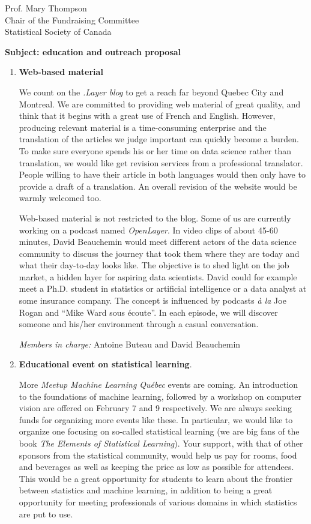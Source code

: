 \documentclass[11pt, a4paper]{letter} %
\begin{document}
\begin{letter}{
	Prof. Mary Thompson\\
	Chair of the Fundraising Committee\\
	Statistical Society of Canada
	
	\bigskip
	\textbf{Subject: education and outreach proposal}%
}
\begin{enumerate}
	\bigskip
	\emph{Member in charge:} Stéphane Caron\\
	
	\item \textbf{Web-based material}
	
	\quad We count on the \emph{.Layer blog} to get a reach far beyond Quebec City and Montreal. We are committed to providing web material of great quality, and think that it begins with a great use of French and English. However, producing relevant material is a time-consuming enterprise and the translation of the articles we judge important can quickly become a burden. To make sure everyone spends his or her time on data science rather than translation, we would like get revision services from a professional translator. People willing to have their article in both languages would then only have to provide a draft of a translation. An overall revision of the website would be warmly welcomed too.
	
	\quad Web-based material is not restricted to the blog. Some of us are currently working on a podcast named \emph{OpenLayer}. In video clips of about 45-60 minutes, David Beauchemin would meet different actors of the data science community to discuss the journey that took them where they are today and what their day-to-day looks like. The objective is to shed light on the job market, a hidden layer for aspiring data scientists. David could for example meet a Ph.D. student in statistics or artificial intelligence or a data analyst at some insurance company. The concept is influenced by podcasts \emph{à la} Joe Rogan and ``Mike Ward sous écoute''. In each episode, we will discover someone and his/her environment through a casual conversation.
	
	\bigskip
	\emph{Members in charge:} Antoine Buteau and David Beauchemin\\
	
	\item \textbf{Educational event on statistical learning}.
	
	\quad More \emph{Meetup Machine Learning Québec} events are coming. An introduction to the foundations of machine learning, followed by a workshop on computer vision are offered on February 7 and 9 respectively. We are always seeking funds for organizing more events like these. In particular, we would like to organize one focusing on so-called statistical learning (we are big fans of the book \emph{The Elements of Statistical Learning}). Your support, with that of other sponsors from the statistical community, would help us pay for rooms, food and beverages as well as keeping the price as low as possible for attendees. This would be a great opportunity for students to learn about the frontier between statistics and machine learning, in addition to being a great opportunity for meeting professionals of various domains in which statistics are put to use.


\end{enumerate}
\end{letter}
\end{document}
